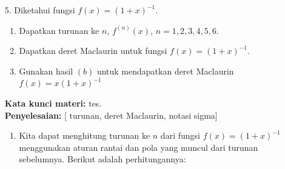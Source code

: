 \documentclass[10pt,openany,a4paper]{article}
\theoremstyle{definition}
\theoremstyle{definition}
\theoremstyle{plain}
\newenvironment{jawab}[2][tes]{
\textbf{Kata kunci materi:} #1.\\
\textbf{Penyelesaian:} #2
}{}
\newenvironment{jawaban}[2][tes]{
\colorlet{oldcolor}{.}
        \color{red}
        \setlength{\fboxrule}{1pt}\boxed{\color{oldcolor}#2}\color{oldcolor}.
}{}
\begin{document}
\begin{enumerate}
\begin{jawab}[barisan, limit tak hingga, konvergensi]
{                    Selanjutnya, kita tentukan apakah barisan tersebut konvergen atau divergen dengan menghitung limitnya saat $n$ mendekati tak hingga:
                    \begin{align*}
                        \colorlet{oldcolor}{.}
        \color{blue}        \setlength{\fboxrule}{1pt} \boxed{\color{oldcolor}L=\lim_{n\to\infty} \frac{n}{3n+1}}\color{oldcolor}.
                    \end{align*}
                    Untuk menghitung limit tersebut, kita dapat membagi pembilang dan penyebut dengan $n$ untuk mendapatkan bentuk yang lebih sederhana:
                    \begin{align*}
                        L = \lim_{n\to\infty} \frac{\frac{n}{n}}{\frac{3n+1}{n}} = \lim_{n\to\infty} \frac{1}{3 + \frac{1}{n}}.
                    \end{align*}
                    Saat $n$ mendekati tak hingga, $\frac{1}{n}$ mendekati $0$, sehingga kita dapatkan:
                    \begin{align*}
                        L = \frac{1}{3 + 0} = \frac{1}{3}.
                    \end{align*}
                    Karena limitnya adalah $\frac{1}{3}$, maka barisan tersebut \textbf{konvergen} dan nilai kekonvergenannya adalah $\begin{jawaban}{\frac{1}{3}}\end{jawaban}$
                }
            \end{jawab}
            \item[5.] Diketahui fungsi $f(x)=(1+x)^{-1}$.
            \begin{enumerate}
                \item Dapatkan turunan ke $n$, $f^{(n)}(x)$, $n=1,2,3,4,5,6$.
                \item Dapatkan deret Maclaurin untuk fungsi $f(x)=(1+x)^{-1}$.
                \item Gunakan hasil $(b)$ untuk mendapatkan deret Maclaurin $f(x)=x(1+x)^{-1}$
            \end{enumerate}
            \begin{jawab}
                [turunan, deret Maclaurin, notasi sigma]{
                        \begin{enumerate}
                        \item Kita dapat menghitung turunan ke $n$ dari fungsi $f(x)=(1+x)^{-1}$ menggunakan aturan rantai dan pola yang muncul dari turunan sebelumnya. Berikut adalah perhitungannya:

\end{enumerate}}
\end{jawab}
\end{enumerate}
\end{document}
